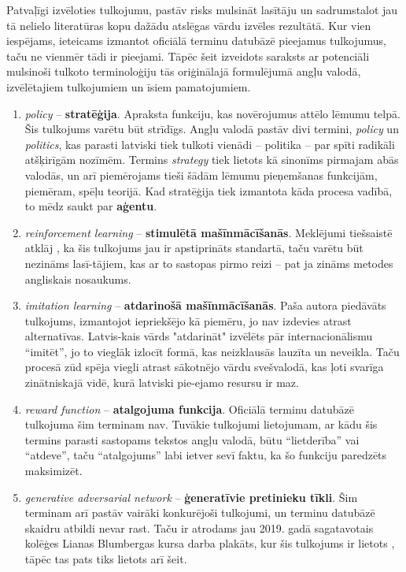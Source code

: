 \documentclass[12pt, a4paper]{article}
\numberwithin{equation}{section} %
\begin{document}
Patvaļīgi izvēloties tulkojumu, pastāv risks mulsināt lasītāju un sadrumstalot jau tā nelielo literatūras kopu dažādu atslēgas vārdu izvēles rezultātā. Kur vien iespējams, ieteicams izmantot oficiālā terminu datubāzē pieejamus tulkojumus, taču ne vienmēr tādi ir pieejami. Tāpēc šeit izveidots saraksts ar potenciāli mulsinoši tulkoto terminoloģiju tās oriģinālajā formulējumā angļu valodā, izvēlētajiem tulkojumiem un īsiem pamatojumiem.  

\begin{enumerate}
    \item \textit{policy} -- \textbf{stratēģija}. Apraksta funkciju, kas novērojumus attēlo lēmumu telpā. Šis tulkojums varētu būt strīdīgs. Angļu valodā pastāv divi termini, \textit{policy} un \textit{politics}, kas parasti latviski tiek tulkoti vienādi -- politika -- par spīti radikāli atšķirīgām nozīmēm. Termins \textit{strategy} tiek lietots kā sinonīms pirmajam abās valodās, un arī piemērojams tieši šādām lēmumu pieņemšanas funkcijām, piemēram, spēļu teorijā. Kad stratēģija tiek izmantota kāda procesa vadībā, to mēdz saukt par \textbf{aģentu}.
    \item \textit{reinforcement learning} -- \textbf{stimulētā mašīnmācīšanās}. Meklējumi tiešsaistē atklāj \cite{enc_stim}, ka šis tulkojums jau ir apstiprināts standartā, taču varētu būt nezināms lasī-tājiem, kas ar to sastopas pirmo reizi -- pat ja zināms metodes angliskais nosaukums.
    \item \textit{imitation learning} -- \textbf{atdarinošā mašīnmācīšanās}. Paša autora piedāvāts tulkojums, izmantojot iepriekšējo kā piemēru, jo nav izdevies atrast alternatīvas. Latvis-kais vārds "atdarināt" izvēlēts pār internacionālismu ``imitēt'', jo to vieglāk izlocīt formā, kas neizklausās lauzīta un neveikla. Taču procesā zūd spēja viegli atrast sākotnējo vārdu svešvalodā, kas ļoti svarīga zinātniskajā vidē, kurā latviski pie-ejamo resursu ir maz.
    \item \textit{reward function} -- \textbf{atalgojuma funkcija}. Oficiālā terminu datubāzē tulkojuma šim terminam nav. Tuvākie tulkojumi lietojumam, ar kādu šis termins parasti sastopams tekstos angļu valodā, būtu ``lietderība'' vai ``atdeve'', taču ``atalgojums'' labi ietver sevī faktu, ka šo funkciju paredzēts maksimizēt.
    \item \textit{generative adversarial network} -- \textbf{ģeneratīvie pretinieku tīkli}. Šim terminam arī pastāv vairāki konkurējoši tulkojumi, un terminu datubāzē skaidru atbildi nevar rast. Taču ir atrodams jau 2019. gadā sagatavotais kolēģes Lianas Blumbergas kursa darba plakāts, kur šis tulkojums ir lietots \cite{GAN}, tāpēc tas pats tiks lietots arī šeit.
\end{enumerate}
\end{document}
